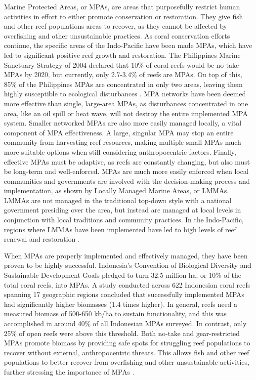 \documentclass{book}\usepackage{knitr}
\begin{document}
Marine Protected Areas, or MPAs, are areas that purposefully restrict human activities in effort to either promote conservation or restoration. They give fish and other reef populations areas to recover, as they cannot be affected by overfishing and other unsustainable practices. As coral conservation efforts continue, the specific areas of the Indo-Pacific have been made MPAs, which have led to significant positive reef growth and restoration. The Philippines Marine Sanctuary Strategy of 2004 declared that 10\% of coral reefs would be no-take MPAs by 2020, but currently, only 2.7-3.4\% of reefs are MPAs. On top of this, 85\% of the Philippines MPAs are concentrated in only two areas, leaving them highly susceptible to ecological disturbances \citep{10.2307/40603378}. MPA networks have been deemed more effective than single, large-area MPAs, as disturbances concentrated in one area, like an oil spill or heat wave, will not destroy the entire implemented MPA system. Smaller networked MPAs are also more easily managed locally, a vital component of MPA effectiveness. A large, singular MPA may stop an entire community from harvesting reef resources, making multiple small MPAs much more suitable options when still considering anthropocentric factors\citep{Keller2009ClimateCC}. Finally, effective MPAs must be adaptive, as reefs are constantly changing, but also must be long-term and well-enforced. MPAs are much more easily enforced when local communities and governments are involved with the decision-making process and implementation, as shown by Locally Managed Marine Areas, or LMMAs. LMMAs are not managed in the traditional top-down style with a national government presiding over the area, but instead are managed at local levels in conjunction with local traditions and community practices. In the Indo-Pacific, regions where LMMAs have been implemented have led to high levels of reef renewal and restoration \citep{cgarden}. 

When MPAs are properly implemented and effectively managed, they have been proven to be highly successful. Indonesia’s Convention of Biological Diversity and Sustainable Development Goals pledged to turn 32.5 million ha, or 10\% of the total coral reefs, into MPAs. A study conducted across 622 Indonesian coral reefs spanning 17 geographic regions concluded that successfully implemented MPAs had significantly higher biomasses (1.4 times higher). In general, reefs need a measured biomass of 500-650 kb/ha to sustain functionality, and this was accomplished in around 40\% of all Indonesian MPAs surveyed. In contrast, only 25\% of open reefs were above this threshold. Both no-take and gear-restricted MPAs promote biomass by providing safe spots for struggling reef populations to recover without external, anthropocentric threats. This allows fish and other reef populations to better recover from overfishing and other unsustainable activities, further stressing the importance of MPAs \citep{https://doi.org/10.1111/conl.12698}. 
\end{document}
